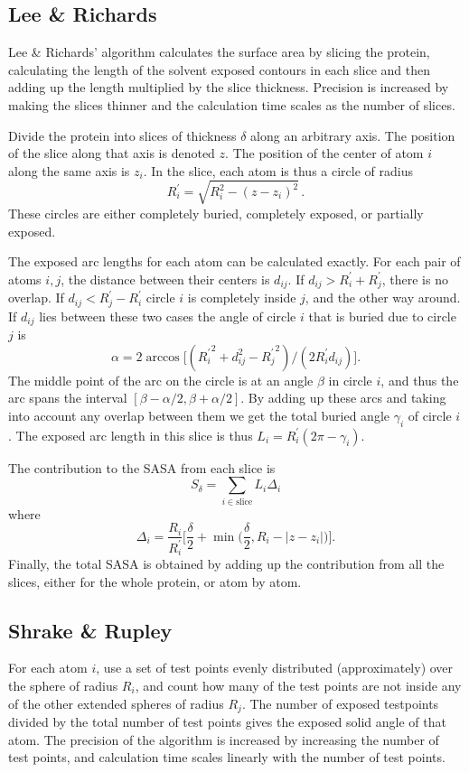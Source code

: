 \documentclass[a4paper,11pt]{article}
\begin{document}
\subsection{Lee \& Richards}

Lee \& Richards' algorithm calculates the surface area by slicing the
protein, calculating the length of the solvent exposed contours in
each slice and then adding up the length multiplied by the slice
thickness. Precision is increased by making the slices thinner and the
calculation time scales as the number of slices.

Divide the protein into slices of thickness $\delta$ along an
arbitrary axis. The position of the slice along that axis is denoted
$z$. The position of the center of atom $i$ along the same axis is
$z_i$. In the slice, each atom is thus a circle of radius $$R_i^\prime
= \sqrt{R_i^2-(z-z_i)^2}\,.$$ These circles are either completely buried,
completely exposed, or partially exposed.

The exposed arc lengths for each atom can be calculated exactly. For
each pair of atoms $i,j$, the distance between their centers is
$d_{ij}$. If $d_{ij} > R_i^\prime + R_j^\prime$, there is no
overlap. If $d_{ij} < R_j^\prime - R_i^\prime$ circle $i$ is
completely inside $j$, and the other way around. If $d_{ij}$ lies
between these two cases the angle of circle $i$ that is buried due to
circle $j$ is $$\alpha = 2\arccos \bigl[({R_i^\prime}^2 + d_{ij}^2 -
  {R_{j}^\prime}^2)/(2R_i^\prime d_{ij})\bigr].$$ The middle point of
the arc on the circle is at an angle $\beta$ in circle $i$, and thus the
arc spans the interval $[\beta-\alpha/2,\beta+\alpha/2]$. By adding up
these arcs and taking into account any overlap between them we get
the total buried angle $\gamma_i$ of circle $i$. The exposed arc length in
this slice is thus $L_i = R_i^\prime(2\pi-\gamma_i)$.

The contribution to the SASA from each slice is $$ S_\delta =
\sum_{i \in \text{slice}}L_i\Delta_i $$ where
$$
  \Delta_i = \frac{R_i}{R_i^\prime} \biggl[\frac{\delta}{2} 
    + \min\biggl(\frac{\delta}{2},R_i -
    \lvert z - z_i \rvert\biggr)\biggr]. 
$$ 
Finally, the total SASA is obtained by adding up the contribution from
all the slices, either for the whole protein, or atom by atom.

\subsection{Shrake \& Rupley}

For each atom $i$, use a set of test points evenly distributed
(approximately) over the sphere of radius $R_i$, and count how many of
the test points are not inside any of the other extended spheres of
radius $R_j$. The number of exposed testpoints divided by the total
number of test points gives the exposed solid angle of that atom. The
precision of the algorithm is increased by increasing the number of
test points, and calculation time scales linearly with the number of
test points.
\end{document}
